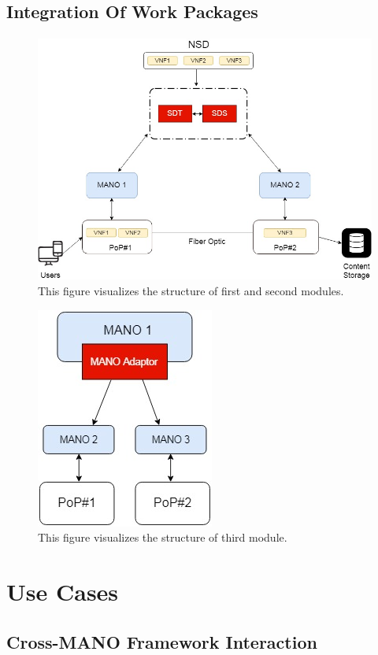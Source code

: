 \subsection{Integration Of Work Packages}
\paragraph{}


\begin{figure}[h]
	\centering
	\includegraphics[width=0.7\linewidth]{figures/Structure1}
	\caption{This figure visualizes the structure of first and second modules. }
	\label{fig:structure1}
\end{figure}

\begin{figure}[h]
	\centering
	\includegraphics[width=0.3\linewidth]{figures/Structure2}
	\caption{This figure visualizes the structure of third module. }
	\label{fig:structure2}
\end{figure}


\newpage
\section{Use Cases}

\subsection{Cross-MANO Framework Interaction}
